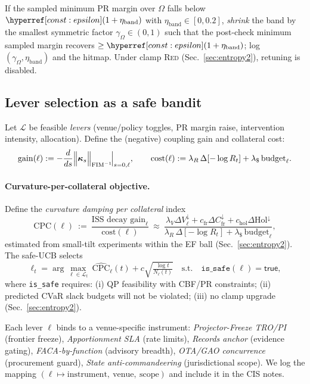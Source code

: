 \begin{definition}\label{def:band-retune}
\emph{}
If the sampled minimum PR margin over $\Omega$ falls below $\constref{epsilon}(1+\eta_{\mathrm{band}})$ with $\eta_{\mathrm{band}}\in[0,0.2]$, \emph{shrink} the band by the smallest symmetric factor $\gamma_\Omega\in(0,1)$ such that the post-check minimum sampled margin recovers $\ge \constref{epsilon}(1+\eta_{\mathrm{band}})$; log $(\gamma_\Omega,\eta_{\mathrm{band}})$ and the hitmap. Under clamp \textsc{Red} (Sec.~\ref{sec:entropy2}), retuning is disabled.
\end{definition}

\subsection*{Lever selection as a safe bandit}\label{sec:ctrl2-bandit}
Let $\mathcal L$ be feasible \emph{levers} (venue/policy toggles, PR margin raise, intervention intensity, allocation). Define the (negative) coupling gain and collateral cost:
\[
\mathrm{gain}(\ell) := -\frac{d}{ds}\Big\|\bm\kappa_s\Big\|_{\mathrm{FIM}^{-1}}\!\Big|_{s=0,\ell},\qquad
\mathrm{cost}(\ell) := \lambda_R\,\Delta[-\log R_t] + \lambda_{\$}\,\text{budget}_\ell.
\]

\paragraph{Curvature-per-collateral objective.}
Define the \emph{curvature damping per collateral} index
\[
\mathrm{CPC}(\ell)\ :=\ \frac{\text{ISS decay gain}_\ell}{\mathrm{cost}(\ell)}
\ \approx\
\frac{\lambda_V \Delta V^{\downarrow}_\ell + c_{\mathrm{fr}}\Delta C_{\mathrm{fr}}^{\downarrow} + c_{\mathrm{hol}}\Delta \mathrm{Hol}^{\downarrow}}{\lambda_R\,\Delta[-\log R_t] + \lambda_{\$}\,\text{budget}_\ell},
\]
estimated from small-tilt experiments within the EF ball (Sec.~\ref{sec:entropy2}). The safe-UCB selects
\[
\ell_t = \arg\max_{\ell\in\mathcal L_t}\ \widehat{\mathrm{CPC}}_\ell(t)
+ c\sqrt{\tfrac{\log t}{N_\ell(t)}}
\quad\text{s.t.}\quad
\texttt{is\_safe}(\ell)=\textsf{true},
\]
where \texttt{is\_safe} requires: (i) QP feasibility with CBF/PR constraints; (ii) predicted CVaR slack budgets will not be violated; (iii) no clamp upgrade (Sec.~\ref{sec:entropy2}).

\begin{definition}\label{def:normative}
\emph{\layertag{Rep/Ctrl}}
Each lever $\ell$ binds to a venue-specific instrument: \emph{Projector-Freeze TRO/PI} (frontier freeze), \emph{Apportionment SLA} (rate limits), \emph{Records anchor} (evidence gating), \emph{FACA-by-function} (advisory breadth), \emph{OTA/GAO concurrence} (procurement guard), \emph{State anti-commandeering} (jurisdictional scope). We log the mapping $(\ell\!\mapsto\!\text{instrument},\ \text{venue},\ \text{scope})$ and include it in the CIS notes.
\end{definition}

